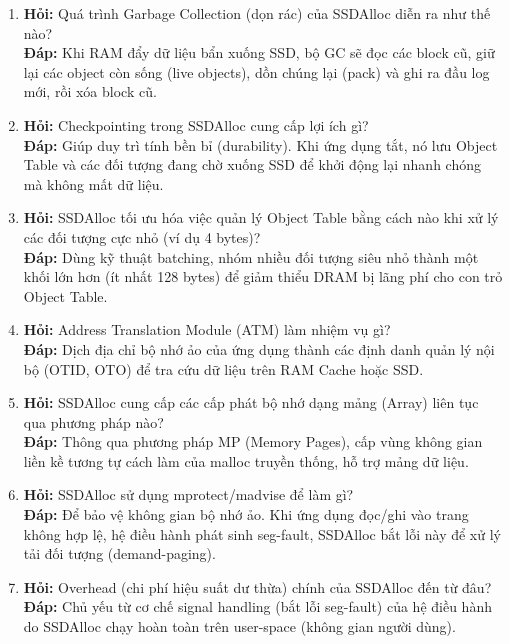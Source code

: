 \documentclass[12pt,a4paper]{article}
\begin{document}
\begin{enumerate}
    \item \textbf{Hỏi:} Quá trình Garbage Collection (dọn rác) của SSDAlloc diễn ra như thế nào? \\
    \textbf{Đáp:} Khi RAM đẩy dữ liệu bẩn xuống SSD, bộ GC sẽ đọc các block cũ, giữ lại các object còn sống (live objects), dồn chúng lại (pack) và ghi ra đầu log mới, rồi xóa block cũ.
    
    \item \textbf{Hỏi:} Checkpointing trong SSDAlloc cung cấp lợi ích gì? \\
    \textbf{Đáp:} Giúp duy trì tính bền bỉ (durability). Khi ứng dụng tắt, nó lưu Object Table và các đối tượng đang chờ xuống SSD để khởi động lại nhanh chóng mà không mất dữ liệu.
    
    \item \textbf{Hỏi:} SSDAlloc tối ưu hóa việc quản lý Object Table bằng cách nào khi xử lý các đối tượng cực nhỏ (ví dụ 4 bytes)? \\
    \textbf{Đáp:} Dùng kỹ thuật batching, nhóm nhiều đối tượng siêu nhỏ thành một khối lớn hơn (ít nhất 128 bytes) để giảm thiểu DRAM bị lãng phí cho con trỏ Object Table.
    
    \item \textbf{Hỏi:} Address Translation Module (ATM) làm nhiệm vụ gì? \\
    \textbf{Đáp:} Dịch địa chỉ bộ nhớ ảo của ứng dụng thành các định danh quản lý nội bộ (OTID, OTO) để tra cứu dữ liệu trên RAM Cache hoặc SSD.
    
    \item \textbf{Hỏi:} SSDAlloc cung cấp các cấp phát bộ nhớ dạng mảng (Array) liên tục qua phương pháp nào? \\
    \textbf{Đáp:} Thông qua phương pháp MP (Memory Pages), cấp vùng không gian liền kề tương tự cách làm của malloc truyền thống, hỗ trợ mảng dữ liệu.
    
    \item \textbf{Hỏi:} SSDAlloc sử dụng mprotect/madvise để làm gì? \\
    \textbf{Đáp:} Để bảo vệ không gian bộ nhớ ảo. Khi ứng dụng đọc/ghi vào trang không hợp lệ, hệ điều hành phát sinh seg-fault, SSDAlloc bắt lỗi này để xử lý tải đối tượng (demand-paging).
    
    \item \textbf{Hỏi:} Overhead (chi phí hiệu suất dư thừa) chính của SSDAlloc đến từ đâu? \\
    \textbf{Đáp:} Chủ yếu từ cơ chế signal handling (bắt lỗi seg-fault) của hệ điều hành do SSDAlloc chạy hoàn toàn trên user-space (không gian người dùng).
    

\end{enumerate}
\end{document}
